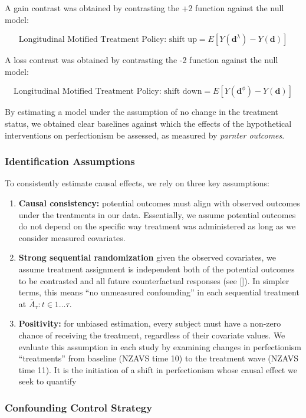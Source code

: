 \documentclass[
  singlecolumn]{article}
\begin{document}
A gain contrast was obtained by contrasting the +2 function against the
null model:

\[ \text{Longitudinal Motified Treatment Policy: shift up} = E[Y(\mathbf{d}^\lambda)- Y(\mathbf{d})] \]

A loss contrast was obtained by contrasting the -2 function against the
null model:

\[ \text{Longitudinal Motified Treatment Policy: shift down} = E[Y(\mathbf{d}^\phi)- Y(\mathbf{d})] \]

By estimating a model under the assumption of no change in the treatment
status, we obtained clear baselines against which the effects of the
hypothetical interventions on perfectionism be assessed, as measured by
\emph{parnter outcomes}.

\subsubsection{Identification
Assumptions}\label{identification-assumptions}

To consistently estimate causal effects, we rely on three key
assumptions:

\begin{enumerate}
\def\labelenumi{\arabic{enumi}.}
\item
  \textbf{Causal consistency:} potential outcomes must align with
  observed outcomes under the treatments in our data. Essentially, we
  assume potential outcomes do not depend on the specific way treatment
  was administered as long as we consider measured covariates.
\item
  \textbf{Strong sequential randomization} given the observed
  covariates, we assume treatment assignment is independent both of the
  potential outcomes to be contrasted and all future counterfactual
  responses (see {[}{]}). In simpler terms, this means ``no unmeasured
  confounding'' in each sequential treatment at
  \(\bar{A}_\tau: t \in 1\dots \tau\).
\item
  \textbf{Positivity:} for unbiased estimation, every subject must have
  a non-zero chance of receiving the treatment, regardless of their
  covariate values. We evaluate this assumption in each study by
  examining changes in perfectionism ``treatments'' from baseline (NZAVS
  time 10) to the treatment wave (NZAVS time 11). It is the initiation
  of a shift in perfectionism whose causal effect we seek to quantify
\end{enumerate}

\subsubsection{Confounding Control
Strategy}\label{confounding-control-strategy}
\end{document}
